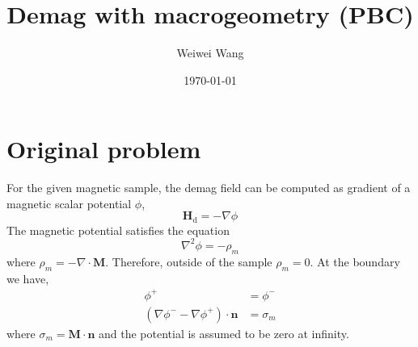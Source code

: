 \documentclass[paper=a4]{scrartcl}
\newcommand{\mvec}[1]{\ensuremath{\mathbf{#1}}}
\newcommand{\mvect}[2]{\ensuremath{\mathbf{#1}_\mathrm{#2}}}
\begin{document}
\title{ \Large Demag with macrogeometry (PBC)}
\author{\normalsize Weiwei Wang}
\date{\normalsize \today}
\maketitle

\section{Original problem}

For the given magnetic sample, the demag field can be computed as gradient of a magnetic scalar potential $\phi$,
\begin{equation}\label{eq_h}
\mvect{H}{d} = - \nabla \phi
\end{equation}
The magnetic potential satisfies the equation
\begin{equation}\label{eq_h}
\nabla^2 \phi = - \rho_m
\end{equation}
where $\rho_m = - \nabla \cdot \mvec{M}$. Therefore, outside of the sample $ \rho_m =0$. At the boundary we have,
\begin{align}
\phi^{+} &= \phi^{-} \\
(\nabla \phi^{-} - \nabla \phi^{+}) \cdot \mvec{n} &= \sigma_m
\end{align}
where $\sigma_m = \mvec{M} \cdot \mvec{n}$ and the potential is assumed to be zero at infinity.
\end{document}
